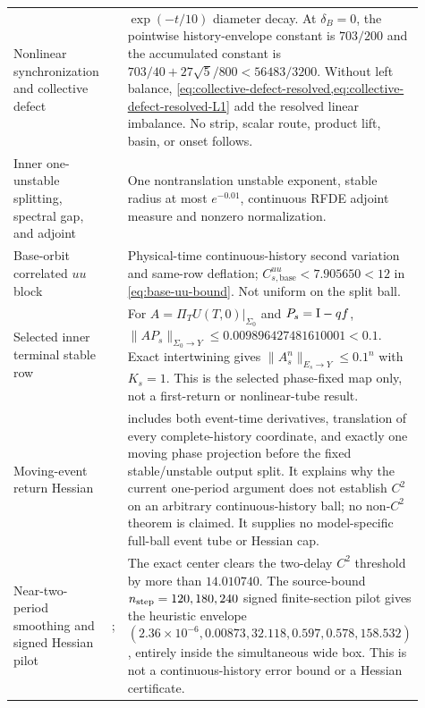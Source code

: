 \begin{longtable}{@{}L{0.28\linewidth}L{0.15\linewidth}L{0.48\linewidth}@{}}
Nonlinear synchronization and collective defect
& 
& \(\exp(-t/10)\) diameter decay.  At \(\delta_B=0\), the pointwise
  history-envelope constant is \(703/200\) and the accumulated constant is
  \(703/40+27\sqrt5/800<56483/3200\).  Without left balance,
  \cref{eq:collective-defect-resolved,eq:collective-defect-resolved-L1}
  add the resolved linear imbalance.  No strip, scalar route, product lift,
  basin, or onset follows.\\

Inner one-unstable splitting, spectral gap, and adjoint
& 
& One nontranslation unstable exponent, stable radius at most
  \(e^{-0.01}\), continuous RFDE adjoint measure and nonzero normalization.\\

Base-orbit correlated \(uu\) block
& 
& Physical-time continuous-history second variation and same-row deflation;
  \(C^{uu}_{s,\mathrm{base}}<7.905650<12\) in
  \cref{eq:base-uu-bound}.  Not uniform on the split ball.\\

Selected inner terminal stable row
& 
& For \(A=\Pi_TU(T,0)|_{\Sigma_0}\) and \(P_s=\mathrm I-qf\),
  \(\|AP_s\|_{\Sigma_0\to Y}\le0.009896427481610001<0.1\).
  Exact intertwining gives \(\|A_s^n\|_{E_s\to Y}\le0.1^n\) with
  \(K_s=1\).  This is the selected phase-fixed map only, not a first-return
  or nonlinear-tube result.\\

Moving-event return Hessian
& 
&  includes both event-time derivatives,
  translation of every complete-history coordinate, and exactly one moving
  phase projection before the fixed stable/unstable output split.  It explains
  why the current one-period argument does not establish \(C^2\) on an
  arbitrary continuous-history ball; no non-\(C^2\) theorem is claimed.  It
  supplies no model-specific full-ball event tube or Hessian cap.\\

Near-two-period smoothing and signed Hessian pilot
& ; 
& The exact center clears the two-delay \(C^2\) threshold by more than
  \(14.010740\).  The source-bound
  \(n_{\rm step}=120,180,240\) signed finite-section
  pilot gives the heuristic envelope
  \((2.36\!\times10^{-6},0.00873,32.118,0.597,0.578,158.532)\), entirely
  inside the simultaneous wide box.  This is not a continuous-history error
  bound or a Hessian certificate.\\


\end{longtable}

